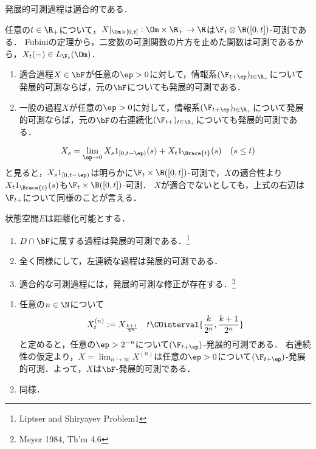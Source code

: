 \documentclass[uplatex,dvipdfmx]{jsreport}
\begin{document}
\begin{proposition}[発展的可測性の必要条件]
    発展的可測過程は適合的である．
\end{proposition}
\begin{Proof}
    任意の$t\in\R_+$について，$X|_{\Om\times[0,t]}:\Om\times\R_+\to\R$は$\F_t\otimes\B([0,t])$-可測である．
    Fubiniの定理から，二変数の可測関数の片方を止めた関数は可測であるから，$X_t(-)\in L_{\F_t}(\Om)$．
\end{Proof}

\begin{lemma}[発展的可測性の十分条件]\mbox{}
    \begin{enumerate}
        \item 適合過程$X\in\bF$が任意の$\ep>0$に対して，情報系$(\F_{t+\ep})_{t\in\R_+}$について発展的可測ならば，元の$\bF$についても発展的可測である．
        \item 一般の過程$X$が任意の$\ep>0$に対して，情報系$(\F_{t+\ep})_{t\in\R_+}$について発展的可測ならば，元の$\bF$の右連続化$(\F_{t+})_{t\in\R_+}$についても発展的可測である．
    \end{enumerate}
\end{lemma}
\begin{Proof}
    \[X_s=\lim_{\ep\to0}X_s1_{[0,t-\ep)}(s)+X_t1_{\Brace{t}}(s)\quad(s\le t)\]
    と見ると，$X_s1_{[0,t-\ep)}$は明らかに$\F_t\times\B([0,t])$-可測で，$X$の適合性より$X_t1_{\Brace{t}}(s)$も$\F_t\times\B([0,t])$-可測．
    $X$が適合でないとしても，上式の右辺は$\F_{t+}$について同様のことが言える．
\end{Proof}

\begin{corollary}[発展的可測過程の例]
    状態空間$E$は距離化可能とする．
    \begin{enumerate}
        \item $D\cap\bF$に属する過程は発展的可測である．\footnote{Liptser and Shiryayev\cite{Liptser-Shiryaev-Statistics} Problem1}
        \item 全く同様にして，左連続な過程は発展的可測である．
        \item 適合的な可測過程には，発展的可測な修正が存在する．\footnote{Meyer 1984, Th'm 4.6}
    \end{enumerate}
\end{corollary}
\begin{Proof}\mbox{}
    \begin{enumerate}
        \item 任意の$n\in\N$について
        \[X^{(n)}_t:=X_{\frac{k+1}{2^n}}\quad t\COinterval{\frac{k}{2^n},\frac{k+1}{2^n}}\]
        と定めると，任意の$\ep>2^{-n}$について$(\F_{t+\ep})$-発展的可測である．
        右連続性の仮定より，$X=\lim_{n\to\infty}X^{(n)}$は任意の$\ep>0$について$(\F_{t+\ep})$-発展的可測．よって，$X$は$\bF$-発展的可測である．
        \item 同様．
    \end{enumerate}
\end{Proof}
\end{document}
